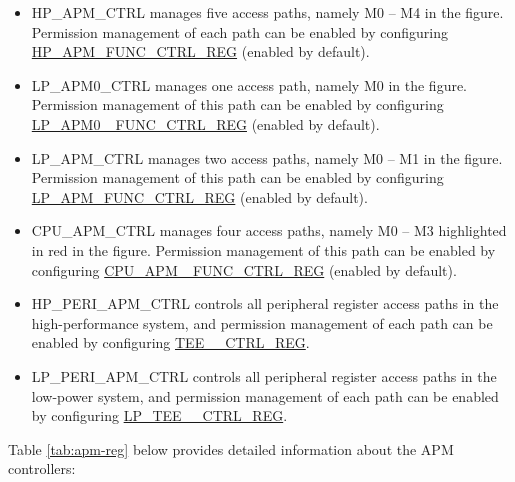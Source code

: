 \documentclass[main\_\_EN.tex]{subfiles}
\begin{document}
\begin{itemize}
    \item HP\_APM\_CTRL manages five access paths, namely M0 – M4 in the figure. Permission management of each path can be enabled by configuring \hyperref[regdesc:HPAPMFUNCCTRLREG]{HP\_APM\_FUNC\_CTRL\_REG} (enabled by default).

    \item LP\_APM0\_CTRL manages one access path, namely M0 in the figure. Permission management of this path can be enabled by configuring \hyperref[regdesc:LPAPM0FUNCCTRLREG]{LP\_APM0 \_FUNC\_CTRL\_REG} (enabled by default).

    \item LP\_APM\_CTRL manages two access paths, namely M0 – M1 in the figure. Permission management of this path can be enabled by configuring \hyperref[regdesc:LPAPMFUNCCTRLREG]{LP\_APM\_FUNC\_CTRL\_REG} (enabled by default).

    \item CPU\_APM\_CTRL manages four access paths, namely M0 – M3 highlighted in red in the figure. Permission management of this path can be enabled by configuring \hyperref[regdesc:CPUAPMFUNCCTRLREG]{CPU\_APM \_FUNC\_CTRL\_REG} (enabled by default).

    \item HP\_PERI\_APM\_CTRL controls all peripheral register access paths in the high-performance system, and permission management of each path can be enabled by configuring \hyperref[regdesc:TEEPERICTRLREG]{TEE\_\_CTRL\_REG}.

    \item LP\_PERI\_APM\_CTRL controls all peripheral register access paths in the low-power system, and permission management of each path can be enabled by configuring \hyperref[regdesc:LPTEEPERICTRLREG]{LP\_TEE\_\_CTRL\_REG}.
\end{itemize}

Table \ref{tab:apm-reg} below provides detailed information about the APM controllers:
\end{document}
